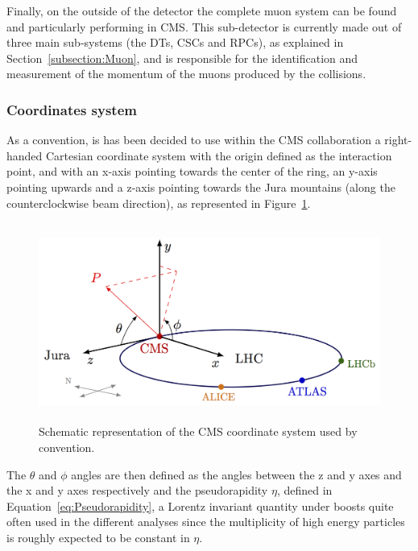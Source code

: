 \documentclass[a4paper, 10pt, openright]{report}
\begin{document}
Finally, on the outside of the detector the complete muon system can be found and particularly performing in \ac{CMS}. This sub-detector is currently made out of three main sub-systems (the \acp{DT}, \acp{CSC} and \acp{RPC}), as explained in Section~\ref{subsection:Muon}, and is responsible for the identification and measurement of the momentum of the muons produced by the collisions.

\subsubsection*{Coordinates system}

As a convention, is has been decided to use within the \ac{CMS} collaboration a right-handed Cartesian coordinate system with the origin defined as the interaction point, and with an x-axis pointing towards the center of the ring, an y-axis pointing upwards and a z-axis pointing towards the Jura mountains (along the counterclockwise beam direction), as represented in Figure~\ref{fig:CMSAxis}. 

\begin{figure}[htbp]
\begin{center}
\includegraphics[width=12.2cm, height=6.5cm]{figs/CMSAxis.png}
\caption{Schematic representation of the \ac{CMS} coordinate system used by convention.}
\label{fig:CMSAxis}
\end{center}
\end{figure}

The $\theta$ and $\phi$ angles are then defined as the angles between the z and y axes and the x and y axes respectively and the pseudorapidity $\eta$, defined in Equation~\ref{eq:Pseudorapidity}, a Lorentz invariant quantity under boosts quite often used in the different analyses since the multiplicity of high energy particles is roughly expected to be constant in $\eta$.
\end{document}
